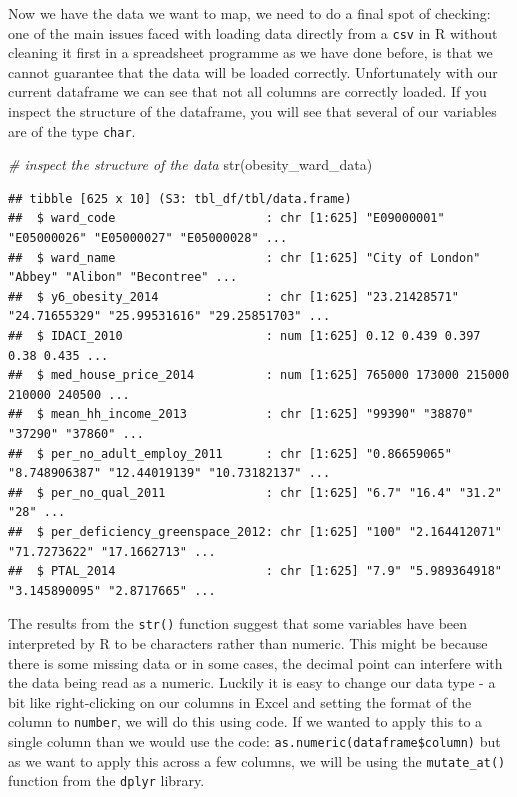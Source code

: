 \documentclass[
]{book}
\newenvironment{Shaded}{\begin{snugshade}}{\end{snugshade}}
\newcommand{\CommentTok}[1]{\textcolor[rgb]{0.56,0.35,0.01}{\textit{#1}}}
\newcommand{\FunctionTok}[1]{\textcolor[rgb]{0.00,0.00,0.00}{#1}}
\newcommand{\NormalTok}[1]{#1}
\begin{document}
Now we have the data we want to map, we need to do a final spot of checking: one of the main issues faced with loading data directly from a \texttt{csv} in R without cleaning it first in a spreadsheet programme as we have done before, is that we cannot guarantee that the data will be loaded correctly. Unfortunately with our current dataframe we can see that not all columns are correctly loaded. If you inspect the structure of the dataframe, you will see that several of our variables are of the type \texttt{char}.

\begin{Shaded}
\begin{Highlighting}[]
\CommentTok{\# inspect the structure of the data}
\FunctionTok{str}\NormalTok{(obesity\_ward\_data)}
\end{Highlighting}
\end{Shaded}

\begin{verbatim}
## tibble [625 x 10] (S3: tbl_df/tbl/data.frame)
##  $ ward_code                     : chr [1:625] "E09000001" "E05000026" "E05000027" "E05000028" ...
##  $ ward_name                     : chr [1:625] "City of London" "Abbey" "Alibon" "Becontree" ...
##  $ y6_obesity_2014               : chr [1:625] "23.21428571" "24.71655329" "25.99531616" "29.25851703" ...
##  $ IDACI_2010                    : num [1:625] 0.12 0.439 0.397 0.38 0.435 ...
##  $ med_house_price_2014          : num [1:625] 765000 173000 215000 210000 240500 ...
##  $ mean_hh_income_2013           : chr [1:625] "99390" "38870" "37290" "37860" ...
##  $ per_no_adult_employ_2011      : chr [1:625] "0.86659065" "8.748906387" "12.44019139" "10.73182137" ...
##  $ per_no_qual_2011              : chr [1:625] "6.7" "16.4" "31.2" "28" ...
##  $ per_deficiency_greenspace_2012: chr [1:625] "100" "2.164412071" "71.7273622" "17.1662713" ...
##  $ PTAL_2014                     : chr [1:625] "7.9" "5.989364918" "3.145890095" "2.8717665" ...
\end{verbatim}

The results from the \texttt{str()} function suggest that some variables have been interpreted by R to be characters rather than numeric. This might be because there is some missing data or in some cases, the decimal point can interfere with the data being read as a numeric. Luckily it is easy to change our data type - a bit like right-clicking on our columns in Excel and setting the format of the column to \texttt{number}, we will do this using code. If we wanted to apply this to a single column than we would use the code: \texttt{as.numeric(dataframe\$column)} but as we want to apply this across a few columns, we will be using the \texttt{mutate\_at()} function from the \texttt{dplyr} library.
\end{document}

